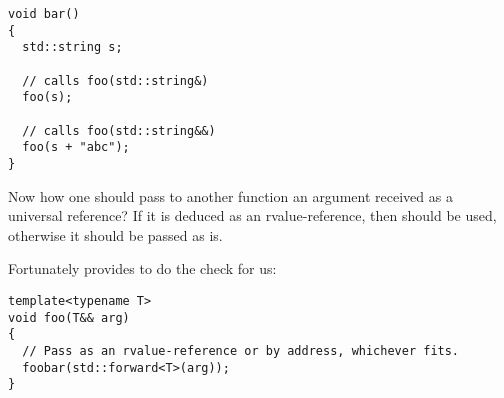 \begin{lstlisting}
void bar()
{
  std::string s;

  // calls foo(std::string&)
  foo(s);

  // calls foo(std::string&&)
  foo(s + "abc");
}
\end{lstlisting}

Now how one should pass to another function an argument received as a
universal reference? If it is deduced as an rvalue-reference, then
 should be used, otherwise it should be passed as
is.

%
%
Fortunately  provides  to do the check for
us:

\begin{lstlisting}
template<typename T>
void foo(T&& arg)
{
  // Pass as an rvalue-reference or by address, whichever fits.
  foobar(std::forward<T>(arg));
}
\end{lstlisting}
